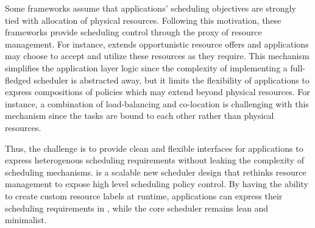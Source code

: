 Some frameworks \cite{yarn, mesos} assume that applications' scheduling objectives are strongly tied with allocation of physical resources. Following this motivation, these frameworks provide scheduling control through the proxy of resource management. For instance, \cite{mesos} extends opportunistic resource offers and applications may choose to accept and utilize these resources as they require. This mechanism simplifies the application layer logic since the complexity of implementing a full-fledged scheduler is abstracted away, but it limits the flexibility of applications to express compositions of policies which may extend beyond physical resources. For instance, a combination of load-balancing and co-location is challenging with this mechanism since the tasks are bound to each other rather than physical resources.  

Thus, the challenge is to provide clean and flexible interfaces for applications to express heterogenous scheduling requirements without leaking the complexity of scheduling mechanisms. \name{} is a scalable new scheduler design that rethinks resource management to expose high level scheduling policy control. By having the ability to create custom resource labels at runtime, applications can express their scheduling requirements in \name{}, while the core scheduler remains lean and minimalist.  



